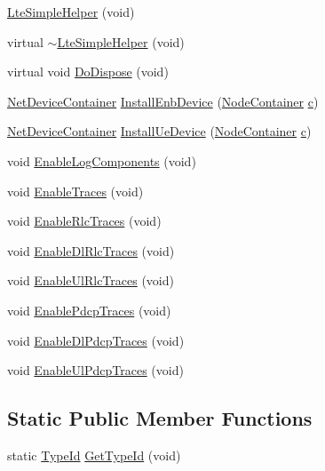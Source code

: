 \begin{DoxyCompactItemize}
\item 
\hyperlink{classns3_1_1LteSimpleHelper_a4739286269c92ae6ade3ecbdfc750d45}{Lte\+Simple\+Helper} (void)
\item 
virtual \hyperlink{classns3_1_1LteSimpleHelper_a29e69e043270e521999bffdc8f422ef3}{$\sim$\+Lte\+Simple\+Helper} (void)
\item 
virtual void \hyperlink{classns3_1_1LteSimpleHelper_aada8f3c2d5cc5da5321e5d268881742c}{Do\+Dispose} (void)
\item 
\hyperlink{classns3_1_1NetDeviceContainer}{Net\+Device\+Container} \hyperlink{classns3_1_1LteSimpleHelper_a406e71dd8dcda8fa2f9a9fc31ff6494a}{Install\+Enb\+Device} (\hyperlink{classns3_1_1NodeContainer}{Node\+Container} \hyperlink{mmwave_2model_2fading-traces_2fading__trace__generator_8m_ae0323a9039add2978bf5b49550572c7c}{c})
\item 
\hyperlink{classns3_1_1NetDeviceContainer}{Net\+Device\+Container} \hyperlink{classns3_1_1LteSimpleHelper_aa575a9480b50754a2a01e038ca5c5f27}{Install\+Ue\+Device} (\hyperlink{classns3_1_1NodeContainer}{Node\+Container} \hyperlink{mmwave_2model_2fading-traces_2fading__trace__generator_8m_ae0323a9039add2978bf5b49550572c7c}{c})
\item 
void \hyperlink{classns3_1_1LteSimpleHelper_a902a5c5e369d2982125de901f6e331e5}{Enable\+Log\+Components} (void)
\item 
void \hyperlink{classns3_1_1LteSimpleHelper_aefb533d3e1c41ba9c4529de59c5c7d4e}{Enable\+Traces} (void)
\item 
void \hyperlink{classns3_1_1LteSimpleHelper_abff67d6b74b1d2e9c6ca6a23a8a569d5}{Enable\+Rlc\+Traces} (void)
\item 
void \hyperlink{classns3_1_1LteSimpleHelper_a7a654f596c2bee22b65bfff9fe13fc45}{Enable\+Dl\+Rlc\+Traces} (void)
\item 
void \hyperlink{classns3_1_1LteSimpleHelper_ab751a263d58747bbca0feea01bba19cb}{Enable\+Ul\+Rlc\+Traces} (void)
\item 
void \hyperlink{classns3_1_1LteSimpleHelper_af104a1aed2953aa4f8fce9725aaf8ee8}{Enable\+Pdcp\+Traces} (void)
\item 
void \hyperlink{classns3_1_1LteSimpleHelper_a24f7f70458bca4a2a754f94473ebe59f}{Enable\+Dl\+Pdcp\+Traces} (void)
\item 
void \hyperlink{classns3_1_1LteSimpleHelper_afff7cc8dfd05d9c65a4625f9c246c8b7}{Enable\+Ul\+Pdcp\+Traces} (void)
\end{DoxyCompactItemize}
\subsection*{Static Public Member Functions}
\begin{DoxyCompactItemize}
\item 
static \hyperlink{classns3_1_1TypeId}{Type\+Id} \hyperlink{classns3_1_1LteSimpleHelper_aab642f35293ae776e8045be02f1de6f7}{Get\+Type\+Id} (void)
\end{DoxyCompactItemize}
